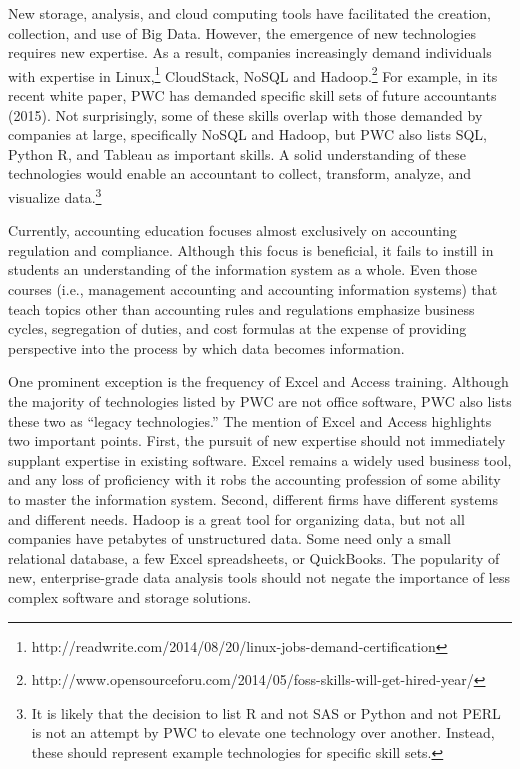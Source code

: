 \documentclass[12pt]{article}
\begin{document}
New storage, analysis, and cloud computing tools have facilitated the creation, collection, and use of Big Data. However, the emergence of new technologies requires new expertise. As a result, companies increasingly demand individuals with expertise in Linux,\footnote{http://readwrite.com/2014/08/20/linux-jobs-demand-certification} CloudStack, NoSQL and Hadoop.\footnote{http://www.opensourceforu.com/2014/05/foss-skills-will-get-hired-year/} For example, in its recent white paper, PWC has demanded specific skill sets of future accountants (2015). Not surprisingly, some of these skills overlap with those demanded by companies at large, specifically NoSQL and Hadoop, but PWC also lists SQL, Python R, and Tableau as important skills. A solid understanding of these technologies would enable an accountant to collect, transform, analyze, and visualize data.\footnote{It is likely that the decision to list R and not SAS or Python and not PERL is not an attempt by PWC to elevate one technology over another. Instead, these should represent example technologies for specific skill sets.}

Currently, accounting education focuses almost exclusively on accounting regulation and compliance. Although this focus is beneficial, it fails to instill in students an understanding of the information system as a whole. Even those courses (i.e., management accounting and accounting information systems) that teach topics other than accounting rules and regulations emphasize business cycles, segregation of duties, and cost formulas at the expense of providing perspective into the process by which data becomes information.

One prominent exception is the frequency of Excel and Access training. Although the majority of technologies listed by PWC are not office software, PWC also lists these two as ``legacy technologies.'' The mention of Excel and Access highlights two important points. First, the pursuit of new expertise should not immediately supplant expertise in existing software. Excel remains a widely used business tool, and any loss of proficiency with it robs the accounting profession of some ability to master the information system. Second, different firms have different systems and different needs. Hadoop is a great tool for organizing data, but not all companies have petabytes of unstructured data. Some need only a small relational database, a few Excel spreadsheets, or QuickBooks. The popularity of new, enterprise-grade data analysis tools should not negate the importance of less complex software and storage solutions.
\end{document}
